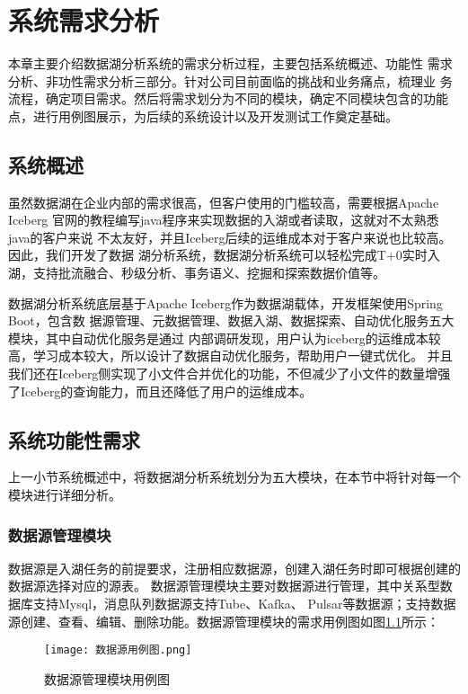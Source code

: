
\chapter{系统需求分析}

本章主要介绍数据湖分析系统的需求分析过程，主要包括系统概述、功能性
需求分析、非功性需求分析三部分。针对公司目前面临的挑战和业务痛点，梳理业
务流程，确定项目需求。然后将需求划分为不同的模块，确定不同模块包含的功能
点，进行用例图展示，为后续的系统设计以及开发测试工作奠定基础。

\section{系统概述}

虽然数据湖在企业内部的需求很高，但客户使用的门槛较高，需要根据Apache Iceberg
官网的教程编写java程序来实现数据的入湖或者读取，这就对不太熟悉java的客户来说
不太友好，并且Iceberg后续的运维成本对于客户来说也比较高。因此，我们开发了数据
湖分析系统，数据湖分析系统可以轻松完成T+0实时入湖，支持批流融合、秒级分析、事务语义、挖掘和探索数据价值等。

数据湖分析系统底层基于Apache Iceberg作为数据湖载体，开发框架使用Spring Boot，包含数
据源管理、元数据管理、数据入湖、数据探索、自动优化服务五大模块，其中自动优化服务是通过
内部调研发现，用户认为iceberg的运维成本较高，学习成本较大，所以设计了数据自动优化服务，帮助用户一键式优化。
并且我们还在Iceberg侧实现了小文件合并优化的功能，不但减少了小文件的数量增强了Iceberg的查询能力，而且还降低了用户的运维成本。

\section{系统功能性需求}

上一小节系统概述中，将数据湖分析系统划分为五大模块，在本节中将针对每一个模块进行详细分析。

\subsection{数据源管理模块}

数据源是入湖任务的前提要求，注册相应数据源，创建入湖任务时即可根据创建的数据源选择对应的源表。
数据源管理模块主要对数据源进行管理，其中关系型数据库支持Mysql，消息队列数据源支持Tube、Kafka、
Pulsar等数据源；支持数据源创建、查看、编辑、删除功能。数据源管理模块的需求用例图如图\ref{fig:数据源用例图}所示：

\begin{figure}[H]
  \centering
  \texttt{[image: 数据源用例图.png]}
  \caption{数据源管理模块用例图}
  \label{fig:数据源用例图}
\end{figure}

